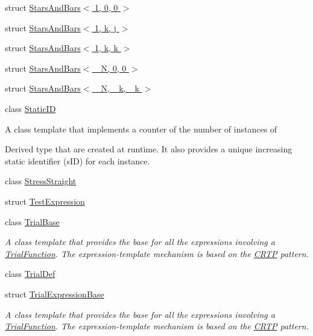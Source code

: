 \begin{DoxyCompactItemize}
\item 
struct \hyperlink{structmodel_1_1_stars_and_bars_3_011_00_010_00_010_01_4}{Stars\+And\+Bars$<$ 1, 0, 0 $>$}
\item 
struct \hyperlink{structmodel_1_1_stars_and_bars_3_011_00_01k_00_01j_01_4}{Stars\+And\+Bars$<$ 1, k, j $>$}
\item 
struct \hyperlink{structmodel_1_1_stars_and_bars_3_011_00_01k_00_01k_01_4}{Stars\+And\+Bars$<$ 1, k, k $>$}
\item 
struct \hyperlink{structmodel_1_1_stars_and_bars_3_01___n_00_010_00_010_01_4}{Stars\+And\+Bars$<$ \+\_\+\+N, 0, 0 $>$}
\item 
struct \hyperlink{structmodel_1_1_stars_and_bars_3_01___n_00_01__k_00_01__k_01_4}{Stars\+And\+Bars$<$ \+\_\+\+N, \+\_\+k, \+\_\+k $>$}
\item 
class \hyperlink{classmodel_1_1_static_i_d}{Static\+I\+D}
\begin{DoxyCompactList}\small\item\em \begin{DoxyVerb}A class template that implements a counter of the number of instances of
\end{DoxyVerb}
 Derived type that are created at runtime. It also provides a unique increasing static identifier (s\+I\+D) for each instance. \end{DoxyCompactList}\item 
class \hyperlink{classmodel_1_1_stress_straight}{Stress\+Straight}
\item 
struct \hyperlink{structmodel_1_1_test_expression}{Test\+Expression}
\item 
class \hyperlink{classmodel_1_1_trial_base}{Trial\+Base}
\begin{DoxyCompactList}\small\item\em A class template that provides the base for all the expressions involving a \hyperlink{classmodel_1_1_trial_function}{Trial\+Function}. The expression-\/template mechanism is based on the \hyperlink{classmodel_1_1_c_r_t_p}{C\+R\+T\+P} pattern. \end{DoxyCompactList}\item 
class \hyperlink{classmodel_1_1_trial_def}{Trial\+Def}
\item 
struct \hyperlink{structmodel_1_1_trial_expression_base}{Trial\+Expression\+Base}
\begin{DoxyCompactList}\small\item\em A class template that provides the base for all the expressions involving a \hyperlink{classmodel_1_1_trial_function}{Trial\+Function}. The expression-\/template mechanism is based on the \hyperlink{classmodel_1_1_c_r_t_p}{C\+R\+T\+P} pattern. \end{DoxyCompactList}\item 

\end{DoxyCompactItemize}
